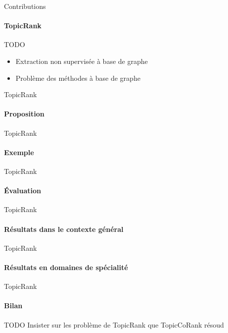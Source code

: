 \begin{frame}{Contributions}\framesubtitle{TopicRank}
  \begin{alertblock}{TODO}
    \begin{itemize}
      \item{Extraction non supervisée à base de graphe}
      \item{Problème des méthodes à base de graphe}
    \end{itemize}
  \end{alertblock}
\end{frame}

\begin{frame}{TopicRank}\framesubtitle{Proposition}
\end{frame}

\begin{frame}{TopicRank}\framesubtitle{Exemple}
\end{frame}

\begin{frame}{TopicRank}\framesubtitle{Évaluation}
\end{frame}

\begin{frame}{TopicRank}\framesubtitle{Résultats dans le contexte général}
\end{frame}

\begin{frame}{TopicRank}\framesubtitle{Résultats en domaines de spécialité}
\end{frame}

\begin{frame}{TopicRank}\framesubtitle{Bilan}
  \begin{alertblock}{TODO}
    Insister sur les problème de TopicRank que TopicCoRank résoud
  \end{alertblock}
\end{frame}

